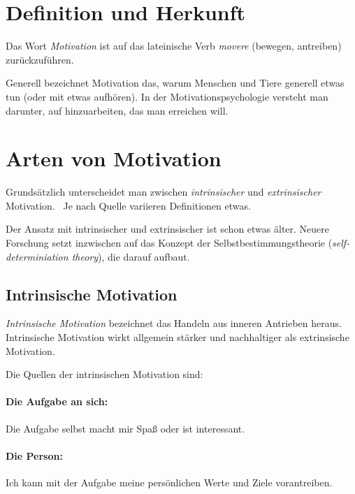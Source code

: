 \section{Definition und Herkunft}

Das Wort \emph{Motivation} ist auf das lateinische Verb \emph{movere} (bewegen, antreiben) zurückzuführen.~\cite{duden-herkunft}

Generell bezeichnet Motivation das, warum Menschen und Tiere generell etwas tun (oder mit etwas aufhören). In der Motivationspsychologie versteht man darunter, auf hinzuarbeiten, das man erreichen will. \cite{rheinberg-motivation}

\section{Arten von Motivation}

Grundsätzlich unterscheidet man zwischen \emph{intrinsischer} und \emph{extrinsischer} Motivation.~\cite{self-determiniation-theory, pelz-motivation} Je nach Quelle variieren Definitionen etwas.

Der Ansatz mit intrinsischer und extrinsischer ist schon etwas älter. Neuere Forschung setzt inzwischen auf das Konzept der Selbstbestimmungstheorie (\emph{self-determiniation theory}), die darauf aufbaut.


\subsection{Intrinsische Motivation}
\label{intrinsische-motivation}

\emph{Intrinsische Motivation} bezeichnet das Handeln aus inneren Antrieben heraus. Intrinsische Motivation wirkt allgemein stärker und nachhaltiger als extrinsische Motivation.

Die Quellen der intrinsischen Motivation sind:

\paragraph{Die Aufgabe an sich:} Die Aufgabe selbst macht mir Spaß oder ist interessant.

\paragraph{Die Person:} Ich kann mit der Aufgabe meine persönlichen Werte und Ziele vorantreiben.

